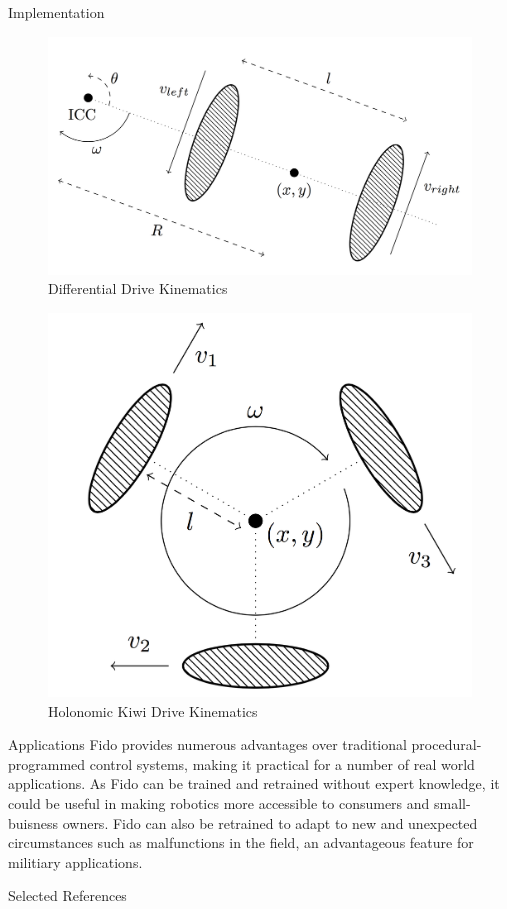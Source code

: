 \documentclass[final]{beamer}
\newlength{\onecolwid}
\begin{document}
\begin{frame}[t]
\begin{columns}[t]
\begin{column}{\onecolwid}
\begin{block}{Implementation}
		\vspace{-0.5in}

		\begin{figure}[ht]
			\centering
			\includegraphics[height=.4\linewidth]{Figures/differentialKinematicsRendered.png}
			\caption{Differential Drive Kinematics}
		\end{figure}

		\vspace{-0.5in}

		\begin{figure}[ht]
			\centering
			\includegraphics[height=.4\linewidth]{Figures/kiwiKinematicsRendered.png}
			\caption{Holonomic Kiwi Drive Kinematics}
		\end{figure}
	\end{block}

	\begin{block}{Applications}
		Fido provides numerous advantages over traditional procedural-programmed control systems, making it practical for a number of real world applications.  As Fido can be trained and retrained without expert knowledge, it could be useful in making robotics more accessible to consumers and small-buisness owners.  Fido can also be retrained to adapt to new and unexpected circumstances such as malfunctions in the field, an advantageous feature for militiary applications.
	\end{block}

	\begin{block}{Selected References}
		\nocite{*}
		{\fontsize{25}{30}\vspace{0.75in}}
	\end{block}

\end{column}

\end{columns}
\end{frame}
\end{document}
